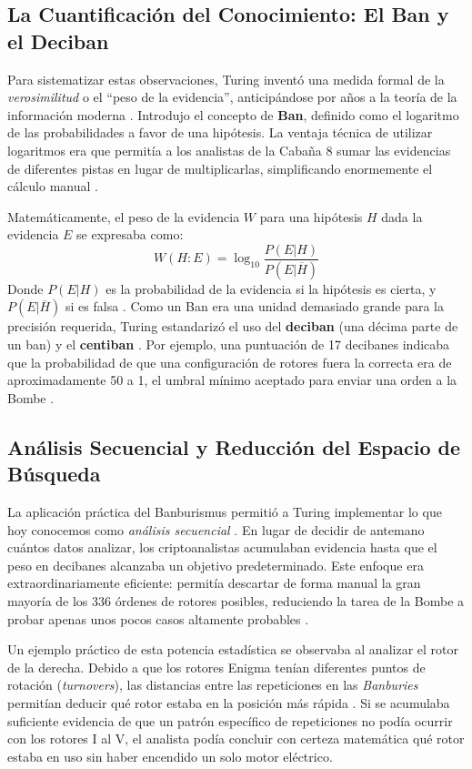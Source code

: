\subsection{La Cuantificación del Conocimiento: El Ban y el Deciban}

Para sistematizar estas observaciones, Turing inventó una medida formal de la \textit{verosimilitud} o el ``peso de la evidencia'', anticipándose por años a la teoría de la información moderna \cite{hodges2014turing, copeland2006colossus}. Introdujo el concepto de \textbf{Ban}, definido como el logaritmo de las probabilidades a favor de una hipótesis. La ventaja técnica de utilizar logaritmos era que permitía a los analistas de la Cabaña 8 sumar las evidencias de diferentes pistas en lugar de multiplicarlas, simplificando enormemente el cálculo manual \cite{hodges2014turing}.

Matemáticamente, el peso de la evidencia $W$ para una hipótesis $H$ dada la evidencia $E$ se expresaba como:
$$W(H:E) = \log_{10} \frac{P(E|H)}{P(E|\overline{H})}$$
Donde $P(E|H)$ es la probabilidad de la evidencia si la hipótesis es cierta, y $P(E|\overline{H})$ si es falsa \cite{hodges2014turing}. Como un Ban era una unidad demasiado grande para la precisión requerida, Turing estandarizó el uso del \textbf{deciban} (una décima parte de un ban) y el \textbf{centiban} \cite{copeland2004essential}. Por ejemplo, una puntuación de 17 decibanes indicaba que la probabilidad de que una configuración de rotores fuera la correcta era de aproximadamente 50 a 1, el umbral mínimo aceptado para enviar una orden a la Bombe \cite{copeland2006colossus}. 

\subsection{Análisis Secuencial y Reducción del Espacio de Búsqueda}

La aplicación práctica del Banburismus permitió a Turing implementar lo que hoy conocemos como \textit{análisis secuencial} \cite{hodges2014turing}. En lugar de decidir de antemano cuántos datos analizar, los criptoanalistas acumulaban evidencia hasta que el peso en decibanes alcanzaba un objetivo predeterminado. Este enfoque era extraordinariamente eficiente: permitía descartar de forma manual la gran mayoría de los 336 órdenes de rotores posibles, reduciendo la tarea de la Bombe a probar apenas unos pocos casos altamente probables \cite{copeland2004essential}.

Un ejemplo práctico de esta potencia estadística se observaba al analizar el rotor de la derecha. Debido a que los rotores Enigma tenían diferentes puntos de rotación (\textit{turnovers}), las distancias entre las repeticiones en las \textit{Banburies} permitían deducir qué rotor estaba en la posición más rápida \cite{copeland2004essential}. Si se acumulaba suficiente evidencia de que un patrón específico de repeticiones no podía ocurrir con los rotores I al V, el analista podía concluir con certeza matemática qué rotor estaba en uso sin haber encendido un solo motor eléctrico.

